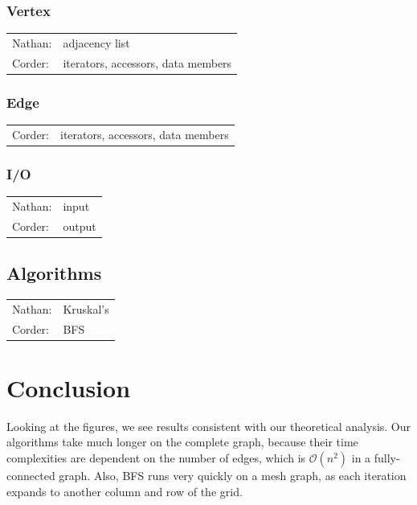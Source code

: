 \documentclass[titlepage]{article}
\begin{document}
\begin{multicols*}{2}
            \subsubsection{Vertex}
                \begin{tabular}{l l}
                    Nathan: & adjacency list \\
                    Corder: & iterators, accessors, data members
                \end{tabular}
            \subsubsection{Edge}
                \begin{tabular}{l l}
                Corder: & iterators, accessors, data members
                \end{tabular}
            \subsubsection{I/O}
                \begin{tabular}{l l}
                   Nathan: & input \\
                   Corder: & output
                \end{tabular}
            \subsection{Algorithms}
                \begin{tabular}{l l}
                    Nathan: & Kruskal's \\
                    Corder: & BFS
                \end{tabular}
        \section{Conclusion}
            Looking at the figures, we see results consistent with our theoretical analysis. Our algorithms take much longer on the complete graph, because their time complexities are dependent on the number of edges, which is $\mathcal{O}(n^2)$ in a fully-connected graph. Also, BFS runs very quickly on a mesh graph, as each iteration expands to another column and row of the grid.
    \end{multicols*}
\end{document}
